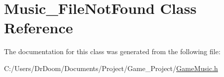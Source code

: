 \hypertarget{class_music___file_not_found}{}\section{Music\+\_\+\+File\+Not\+Found Class Reference}
\label{class_music___file_not_found}


The documentation for this class was generated from the following file\+:\begin{DoxyCompactItemize}
\item 
C\+:/\+Users/\+Dr\+Doom/\+Documents/\+Project/\+Game\+\_\+\+Project/\hyperlink{_game_music_8h}{Game\+Music.\+h}\end{DoxyCompactItemize}
